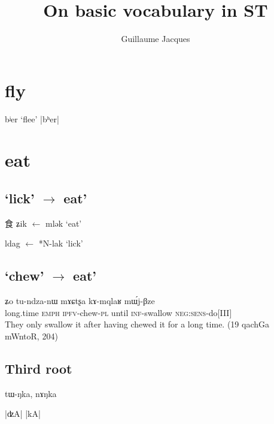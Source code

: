 \documentclass[oldfontcommands,oneside,a4paper,11pt]{article}
\newcommand{\ipa}[1]{{\phon #1}} %
\newcommand{\khyal}[1]{\ipa{|#1|}}
\newcommand{\zh}[1]{{\cn #1}}
\newcommand{\ch}[4]{\zh{#1} \ipa{#2} $\leftarrow$ \ipa{*#3} `#4'}
\begin{document}
 
 \title{On basic vocabulary in ST}
 \author{Guillaume Jacques}
 \maketitle  
 
  \section{fly}
  
  \ipa{bʲer} `flee' \khyal{bʰer}
  
 

 \section{eat}
 
 
 \subsection{`lick' $\rightarrow$  eat'}
\ch{食}{ʑik}{mlək}{eat}

\ipa{ldag} $\leftarrow$ *\ipa{N-lak} `lick'
 \subsection{`chew' $\rightarrow$  eat'}
 
 \begin{exe}
\ex 
\gll \ipa{ʑɯmkhɤm}  	\ipa{ʑo}  	\ipa{tu-ndza-nɯ}  	\ipa{mɤɕtʂa}  	\ipa{kɤ-mqlaʁ}  	\ipa{mɯ́j-βze}   \\
long.time \textsc{emph} \textsc{ipfv}-chew-\textsc{pl} until \textsc{inf}-swallow \textsc{neg:sens}-do[III] \\
\glt They only swallow it after having chewed it for a long time. (19 qachGa mWntoR, 204)
\end{exe}
 \subsection{Third root}
 
 \ipa{tɯ-ŋka}, \ipa{nɤŋka}

\khyal{ʣA} 
 \khyal{kA}
 


\end{document}
